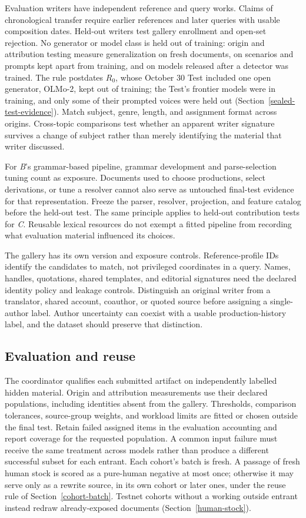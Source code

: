 Evaluation writers have independent reference and query works. Claims of
chronological transfer require earlier references and later queries with usable
composition dates. Held-out writers test gallery enrollment and open-set
rejection. No generator or model class is held out of training: origin and
attribution testing measure generalization on fresh documents, on scenarios
and prompts kept apart from training, and on models released after a detector
was trained. The rule postdates \(R_0\), whose October 30 Test included one
open generator, OLMo-2, kept out of training; the Test's frontier models were in
training, and only some of their prompted voices were held out
(Section~\ref{sealed-test-evidence}). Match subject,
genre, length, and assignment format across origins. Cross-topic comparisons
test whether an apparent writer signature survives a change of subject rather
than merely identifying the material that writer discussed.

For \textit{B}'s grammar-based pipeline, grammar development and
parse-selection tuning count as exposure. Documents used to choose productions,
select derivations, or tune a resolver cannot also serve as untouched
final-test evidence for that representation. Freeze the
parser, resolver, projection, and feature catalog before the held-out test.
The same principle applies to held-out contribution tests for \textit{C}.
Reusable lexical resources do not exempt a fitted pipeline from recording what
evaluation material influenced its choices.

The gallery has its own version and exposure controls. Reference-profile IDs
identify the candidates to match, not privileged coordinates in a query.
Names, handles, quotations, shared templates, and editorial signatures need
the declared identity policy and leakage controls. Distinguish an original
writer from a translator, shared account, coauthor, or quoted source before
assigning a single-author label. Author uncertainty can coexist with a usable
production-history label, and the dataset should preserve that distinction.

\subsection{Evaluation and reuse}

The coordinator qualifies each submitted artifact on independently labelled
hidden material. Origin and attribution measurements use their declared
populations, including identities absent from the gallery. Thresholds, comparison tolerances,
source-group weights, and workload limits are fitted or chosen outside the
final test. Retain failed assigned items in the evaluation accounting and
report coverage for the requested population. A common input failure must
receive the same treatment across models rather than produce a different
successful subset for each entrant. Each cohort's batch is fresh. A passage of
fresh human stock is scored as a pure-human negative at most once; otherwise it
may serve only as a rewrite source, in its own cohort or later ones, under the
reuse rule of Section~\ref{cohort-batch}. Testnet cohorts without a working
outside entrant instead redraw already-exposed documents
(Section~\ref{human-stock}).

